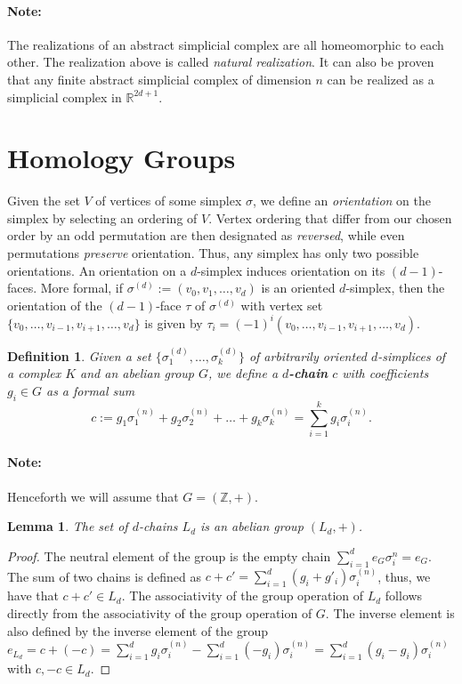 \documentclass{article}
\newtheorem*{definition}{Definition}
\newtheorem*{lemma}{Lemma}
\begin{document}
\paragraph{Note:} The realizations of an abstract simplicial complex are all homeomorphic to each other. The realization above is called \emph{natural realization}. It can also be proven that any finite abstract simplicial complex of dimension $n$ can be realized as a simplicial complex in $\mathbb{R}^{2d+1}$.

\section{Homology Groups}
Given the set $V$ of vertices of some simplex $\sigma$, we define an \emph{orientation} on the simplex by selecting an ordering of $V$. Vertex ordering that differ from our chosen order by an odd permutation are then designated as \emph{reversed}, while even permutations \emph{preserve} orientation. Thus, any simplex has only two possible orientations. An orientation on a $d$-simplex induces orientation on its $(d-1)$-faces. More formal, if $\sigma^{(d)} := (v_0, v_1, \ldots, v_d)$ is an oriented $d$-simplex, then the orientation of the $(d-1)$-face $\tau$ of $\sigma^{(d)}$ with vertex set $\{v_0,\ldots,v_{i-1},v_{i+1},\ldots,v_d\}$ is given by $\tau_i = (-1)^i (v_0, \ldots,v_{i-1},v_{i+1},\ldots,v_d)$.

\begin{definition}
Given a set $\{\sigma_1^{(d)}, \ldots, \sigma_k^{(d)}\}$ of arbitrarily oriented $d$-simplices of a complex $K$ and an abelian group $G$, we define a \textbf{$d$-chain} $c$ with coefficients $g_i \in G$ as a formal sum
\begin{equation}
c := g_1 \sigma^{(n)}_1 + g_2 \sigma^{(n)}_2 + \ldots + g_k \sigma^{(n)}_k = \sum_{i=1}^{k} g_i \sigma^{(n)}_i.
\end{equation}
\end{definition}

\paragraph{Note:} Henceforth we will assume that $G = (\mathbb{Z},+)$.

\begin{lemma}
The set of $d$-chains $L_d$ is an abelian group $(L_d,+)$.
\end{lemma}
\begin{proof}
The neutral element of the group is the empty chain $\sum_{i=1}^{d} e_G \sigma^{n}_i = e_G$. The sum of two chains is defined as $c+c' = \sum_{i=1}^{d} (g_i+g'_i) \sigma_i^{(n)}$, thus, we have that $c+c' \in L_d$. The associativity of the group operation of $L_d$ follows directly from the associativity of the group operation of $G$. The inverse element is also defined by the inverse element of the group $e_{L_d} = c + (-c) = \sum_{i=1}^{d} g_i \sigma_i^{(n)} - \sum_{i=1}^{d} (-g_i) \sigma_i^{(n)} =  \sum_{i=1}^{d} (g_i-g_i) \sigma_i^{(n)}$ with $c,-c \in L_d$.
\end{proof}
\end{document}
